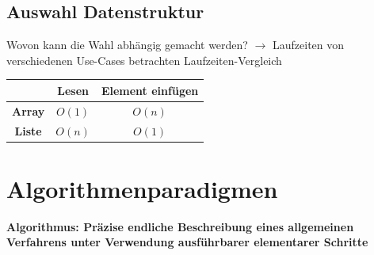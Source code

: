 \documentclass[a4paper, landscape, 8pt]{scrartcl}
\begin{document}
\begin{multicols*}{4}
            \subsection{Auswahl Datenstruktur}
                Wovon kann die Wahl abhängig gemacht werden? $\to$ Laufzeiten von verschiedenen Use-Cases betrachten
                \newline
                \textcolor{subsectioncolor}{Laufzeiten-Vergleich}
                \newline
                \begin{tabular}{ |c|c|c| }
                    \hline
                    & {\bfseries Lesen} & {\bfseries Element einfügen} \\
                    \hline
                    {\bfseries Array} & $O(1)$ & $O(n)$ \\
                    {\bfseries Liste} & $O(n)$ & $O(1)$ \\
                    \hline
                \end{tabular}

        \section{Algorithmenparadigmen}
            {\bfseries Algorithmus: Präzise endliche Beschreibung eines allgemeinen Verfahrens unter Verwendung
            ausführbarer elementarer Schritte}


\end{multicols*}
\end{document}
